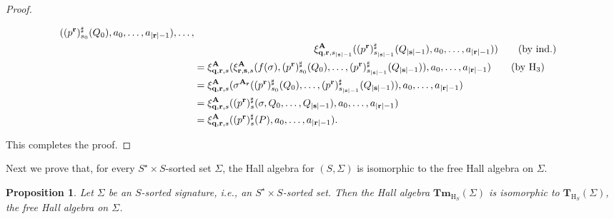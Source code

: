 \documentclass{amsart}
\newcommand{\bb}[1]{\ensuremath
	{\lvert #1 \rvert}}
\theoremstyle{plain}
\newtheorem{proposition}[theorem]{Proposition}
\theoremstyle{definition}
\begin{document}
\begin{proof}
\begin{flushleft}
\begin{align*}
			((p^{\mathbf{r}})^{\sharp}_{s_{0}}(Q_{0}),a_{0},\ldots,a_{\bb{\mathbf{r}}-1}),
			\ldots, 
			\\&\qquad\qquad\qquad\qquad\qquad\qquad
			\xi_{\mathbf{q},\mathbf{r},s_{\bb{\mathbf{s}}-1}}^{\mathbf{A}}
			((p^{\mathbf{r}})^{\sharp}_{s_{\bb{\mathbf{s}}-1}}(Q_{\bb{\mathbf{s}}-1}),a_{0},\ldots,a_{\bb{\mathbf{r}}-1})
			) \tag{by ind.}
			\\&=
			\xi_{\mathbf{q},\mathbf{r},s}^{\mathbf{A}}
			(
			\xi_{\mathbf{r},\mathbf{s},s}^{\mathbf{A}}
			(f(\sigma),
			(p^{\mathbf{r}})^{\sharp}_{s_{0}}(Q_{0}),
			\ldots,
			(p^{\mathbf{r}})^{\sharp}_{s_{\bb{\mathbf{s}}-1}}(Q_{\bb{\mathbf{s}}-1})
			),
			a_{0},
			\ldots,
			a_{\bb{\mathbf{r}}-1}
			) \tag{by $\mathrm{H}_{3}$}   \\
			&=
			\xi_{\mathbf{q},\mathbf{r},s}^{\mathbf{A}}
			(
			\sigma^{\mathbf{A}_{\mathbf{r}}}
			(
			(p^{\mathbf{r}})^{\sharp}_{s_{0}}(Q_{0}),
			\ldots,
			(p^{\mathbf{r}})^{\sharp}_{s_{\bb{\mathbf{s}}-1}}(Q_{\bb{\mathbf{s}}-1})
			),
			a_{0},
			\ldots,
			a_{\bb{\mathbf{r}}-1}
			) \\
			&=
			\xi_{\mathbf{q},\mathbf{r},s}^{\mathbf{A}}
			(
			(p^{\mathbf{r}})^{\sharp}_{s}(\sigma,Q_{0},\ldots,Q_{\bb{\mathbf{s}}-1}),
			a_{0},
			\ldots,
			a_{\bb{\mathbf{r}}-1}
			) \\
			&=
			\xi_{\mathbf{q},\mathbf{r},s}^{\mathbf{A}}
			(
			(p^{\mathbf{r}})^{\sharp}_{s}(P),
			a_{0},
			\ldots,
			a_{\bb{\mathbf{r}}-1}
			).
		\end{align*}
	\end{flushleft}
	This completes the proof.
\end{proof}

Next we prove that, for every $S^{\star}\times S$-sorted set $\Sigma$, the Hall algebra for $(S,\Sigma)$ is isomorphic to the free Hall algebra on $\Sigma$.


\begin{proposition}\label{iso:FrH-TerH}
	Let $\Sigma$ be an $S$-sorted signature, i.e., an $S^{\star}\times S$-sorted set.  Then the Hall algebra $\mathbf{Tm}_{\mathrm{H}_{S}}(\Sigma)$ is isomorphic to $\mathbf{T}_{\mathrm{H}_{S}}(\Sigma)$, the free Hall algebra on $\Sigma$.
\end{proposition}
\end{document}
